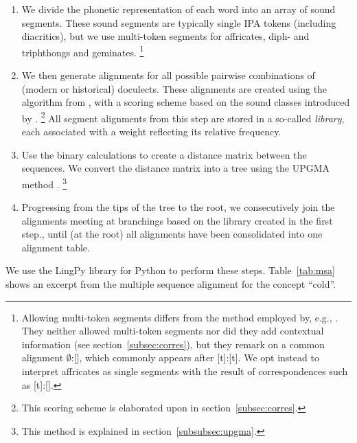 \documentclass[a4paper]{article}
\begin{document}
\begin{enumerate}
\item
We divide the phonetic representation of each word into an array of sound segments.
These sound segments are typically single IPA tokens (including diacritics),
but we use multi-token segments for affricates, diph- and triphthongs and geminates.
\footnote{
Allowing multi-token segments differs from
the method employed by, e.g., \citet{wieling2010hierarchical}.
They neither allowed multi-token segments nor did they add contextual information
(see section~\ref{subsec:corres}),
but they remark on a common alignment $\emptyset$:[\textesh],
which commonly appears after [t]:[t].
We opt instead to interpret affricates as single segments with
the result of correspondences such as [t]:[].

}

\item
We then generate alignments for all possible pairwise combinations
of (modern or historical) doculects.
These alignments are created using the algorithm from \citet{needleman1970general},
with a scoring scheme based on the sound classes introduced by \citet{list2012sca}.
\footnote{
This scoring scheme is elaborated upon in section~\ref{subsec:corres}.
}
All segment alignments from this step are stored in a so-called \textit{library},
each associated with a weight reflecting its relative frequency.

\item
{}
Use the binary calculations to create a distance matrix between the sequences.
We convert the distance matrix into a tree using the UPGMA method \citep{sokal1958statistical}.
\footnote{This method is explained in section~\ref{subsubsec:upgma}.}

\item 
Progressing from the tips of the tree to the root,
we consecutively join the alignments meeting at branchings
based on the library created in the first step.,
until (at the root) all alignments have been consolidated into one alignment table.
\end{enumerate}

We use the LingPy library for Python \citep{list2018lingpy} to perform these steps.
Table~\ref{tab:msa}
shows an excerpt from the multiple sequence alignment for the concept ``cold''.
\end{document}
